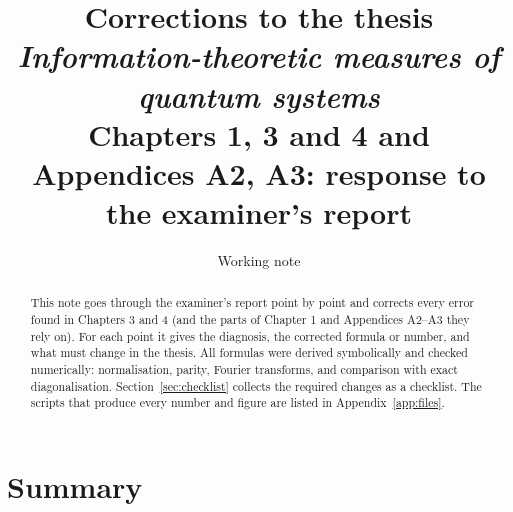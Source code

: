 \documentclass[11pt,a4paper]{article}
\title{\textbf{Corrections to the thesis \emph{Information-theoretic measures of quantum systems}}\\[2pt]
\large Chapters 1, 3 and 4 and Appendices A2, A3: response to the examiner's report}
\author{Working note}
\date{}
\begin{document}
\maketitle

\begin{abstract}
\noindent
This note goes through the examiner's report point by point and corrects every error found
in Chapters 3 and 4 (and the parts of Chapter 1 and Appendices A2--A3 they rely on). For
each point it gives the diagnosis, the corrected formula or number, and what must change
in the thesis. All formulas were derived symbolically and checked numerically:
normalisation, parity, Fourier transforms, and comparison with exact diagonalisation.
Section~\ref{sec:checklist} collects the required changes as a checklist. The scripts that
produce every number and figure are listed in Appendix~\ref{app:files}.
\end{abstract}

\tableofcontents

\section{Summary}
\label{sec:summary}
\end{document}
